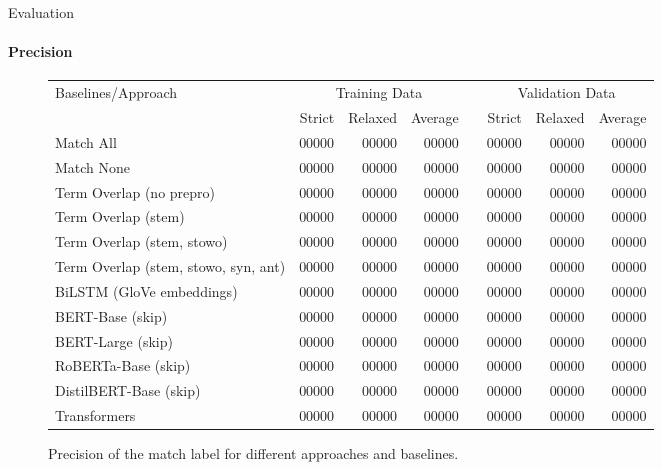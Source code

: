 \documentclass[english,handout]{mlutalk}
\begin{document}
\begin{frame}{Evaluation}
  \framesubtitle{Precision}
  \begin{figure}
    \centering
    \caption{Precision of the match label for different approaches and baselines.}
    \tiny
    \begin{tabular}{lrrrlrrr}
      \toprule
      Baselines/Approach & \multicolumn{3}{c}{Training Data} & & \multicolumn{3}{c}{Validation Data}\\ \cmidrule{2-4} \cmidrule{6-8}
        & Strict & Relaxed & Average & & Strict & Relaxed & Average\\
      \midrule
      Match All                           & 00000 & 00000 & 00000 & & 00000 & 00000 & 00000\\
      Match None                          & 00000 & 00000 & 00000 & & 00000 & 00000 & 00000\\
      Term Overlap (no prepro)            & 00000 & 00000 & 00000 & & 00000 & 00000 & 00000\\
      Term Overlap (stem)                 & 00000 & 00000 & 00000 & & 00000 & 00000 & 00000\\
      Term Overlap (stem, stowo)          & 00000 & 00000 & 00000 & & 00000 & 00000 & 00000\\
      Term Overlap (stem, stowo, syn, ant)& 00000 & 00000 & 00000 & & 00000 & 00000 & 00000\\
      \midrule
      BiLSTM (GloVe embeddings)           & 00000 & 00000 & 00000 & & 00000 & 00000 & 00000\\
      BERT-Base (skip)                    & 00000 & 00000 & 00000 & & 00000 & 00000 & 00000\\
      BERT-Large (skip)                   & 00000 & 00000 & 00000 & & 00000 & 00000 & 00000\\
      RoBERTa-Base (skip)                 & 00000 & 00000 & 00000 & & 00000 & 00000 & 00000\\
      DistilBERT-Base (skip)              & 00000 & 00000 & 00000 & & 00000 & 00000 & 00000\\
      Transformers                        & 00000 & 00000 & 00000 & & 00000 & 00000 & 00000\\
      \bottomrule
    \end{tabular}
  \end{figure}
\end{frame}
\end{document}

